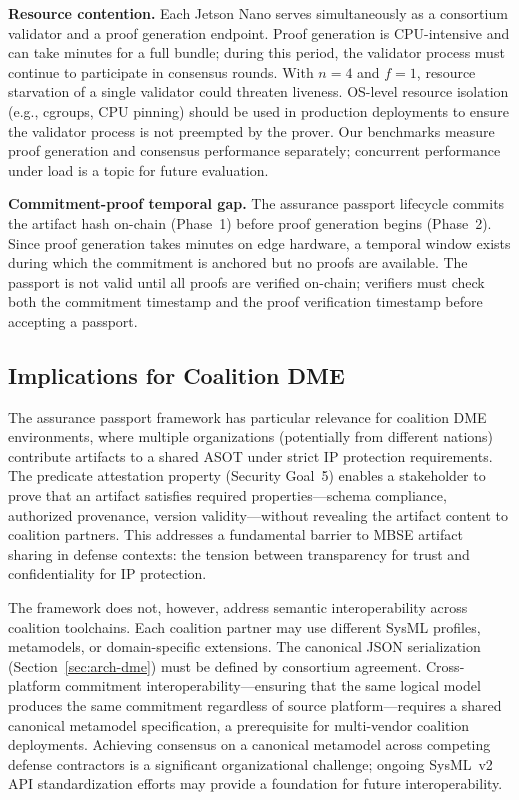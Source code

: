 \textbf{Resource contention.}
Each Jetson Nano serves simultaneously as a consortium validator and a proof generation endpoint.
Proof generation is CPU-intensive and can take minutes for a full bundle; during this period, the validator process must continue to participate in consensus rounds.
With $n=4$ and $f=1$, resource starvation of a single validator could threaten liveness.
OS-level resource isolation (e.g., cgroups, CPU pinning) should be used in production deployments to ensure the validator process is not preempted by the prover.
Our benchmarks measure proof generation and consensus performance separately; concurrent performance under load is a topic for future evaluation.

\textbf{Commitment-proof temporal gap.}
The assurance passport lifecycle commits the artifact hash on-chain (Phase~1) before proof generation begins (Phase~2).
Since proof generation takes minutes on edge hardware, a temporal window exists during which the commitment is anchored but no proofs are available.
The passport is not valid until all proofs are verified on-chain; verifiers must check both the commitment timestamp and the proof verification timestamp before accepting a passport.

\subsection{Implications for Coalition DME}
\label{sec:discussion-coalition}

The assurance passport framework has particular relevance for coalition DME environments, where multiple organizations (potentially from different nations) contribute artifacts to a shared ASOT under strict IP protection requirements.
The predicate attestation property (Security Goal~5) enables a stakeholder to prove that an artifact satisfies required properties---schema compliance, authorized provenance, version validity---without revealing the artifact content to coalition partners.
This addresses a fundamental barrier to MBSE artifact sharing in defense contexts: the tension between transparency for trust and confidentiality for IP protection.

The framework does not, however, address semantic interoperability across coalition toolchains.
Each coalition partner may use different SysML profiles, metamodels, or domain-specific extensions.
The canonical JSON serialization (Section~\ref{sec:arch-dme}) must be defined by consortium agreement.
Cross-platform commitment interoperability---ensuring that the same logical model produces the same commitment regardless of source platform---requires a shared canonical metamodel specification, a prerequisite for multi-vendor coalition deployments.
Achieving consensus on a canonical metamodel across competing defense contractors is a significant organizational challenge; ongoing SysML~v2 API standardization efforts may provide a foundation for future interoperability.

